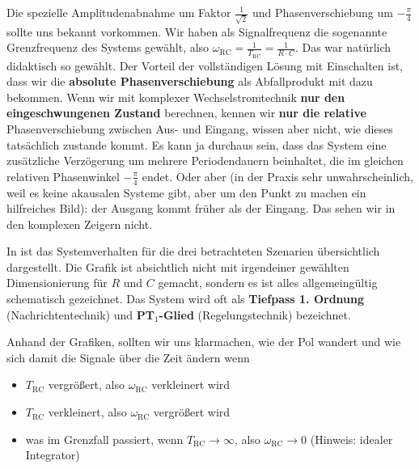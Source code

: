 \begin{Loesung}
\begin{itemize}
Die spezielle Amplitudenabnahme um Faktor $\frac{1}{\sqrt{2}}$ und Phasenverschiebung
um $-\frac{\pi}{4}$ sollte uns bekannt vorkommen. Wir haben als Signalfrequenz
die sogenannte Grenzfrequenz des Systems gewählt, also
$\omega_\mathrm{RC} = \frac{1}{T_\mathrm{RC}} = \frac{1}{R \cdot C}$.
Das war natürlich didaktisch so gewählt.
%
Der Vorteil der vollständigen Lösung mit Einschalten ist, dass wir
die \textbf{absolute Phasenverschiebung} als Abfallprodukt mit dazu bekommen.
%
Wenn wir mit komplexer Wechselstromtechnik \textbf{nur den eingeschwungenen Zustand}
berechnen, kennen wir \textbf{nur die relative} Phasenverschiebung
zwischen Aus- und Eingang, wissen aber nicht, wie dieses tatsächlich zustande kommt.
Es kann ja durchaus sein, dass das System eine zusätzliche Verzögerung
um mehrere Periodendauern beinhaltet,
die im gleichen relativen Phasenwinkel $-\frac{\pi}{4}$ endet.
Oder aber (in der Praxis sehr
unwahrscheinlich, weil es keine akausalen Systeme gibt, aber um den Punkt zu machen
ein hilfreiches Bild): der Ausgang kommt früher als der Eingang.
Das sehen wir in den komplexen Zeigern nicht.

In  ist das Systemverhalten für die drei betrachteten Szenarien
übersichtlich dargestellt.
%
Die Grafik ist absichtlich nicht mit irgendeiner gewählten Dimensionierung
für $R$ und $C$ gemacht, sondern es ist alles allgemeingültig schematisch gezeichnet.
Das System wird oft als \textbf{Tiefpass 1. Ordnung} (Nachrichtentechnik) und
\textbf{PT$_1$-Glied} (Regelungstechnik) bezeichnet.

Anhand der Grafiken, sollten wir uns klarmachen, wie der Pol wandert und
wie sich damit die Signale über die Zeit ändern
wenn
\begin{itemize}
  \item $T_\mathrm{RC}$ vergrößert, also $\omega_\mathrm{RC}$ verkleinert wird
  \item $T_\mathrm{RC}$ verkleinert, also $\omega_\mathrm{RC}$ vergrößert wird
  \item was im Grenzfall passiert, wenn $T_\mathrm{RC}\to\infty$, also
  $\omega_\mathrm{RC}\to 0$ (Hinweis: idealer Integrator)
\end{itemize}



\end{itemize}
\end{Loesung}
